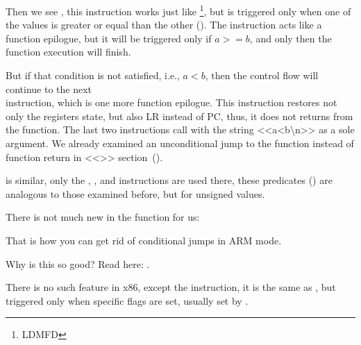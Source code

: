 
Then we see , this instruction works just like \footnote{\ac{LDMFD}},
but is triggered only when one of the values is greater or equal than the other ().
The  instruction acts like a function epilogue, but it will be triggered only if $a>=b$, and only then the function execution will finish.


But if that condition is not satisfied, i.e., $a<b$, then the control flow will continue to the next \\
 instruction, which is one more function epilogue. This instruction restores not only the  registers state, but also \ac{LR} instead of \ac{PC}, thus, it does not returns from the function.
The last two instructions call \printf with the string <<a<b\textbackslash{}n>> as a sole argument.
We already examined an unconditional jump to the \printf function instead of function return in <<\PrintfSeveralArgumentsSectionName>> section~().

 is similar, only the , , and  instructions are used there, these predicates () are analogous to those examined before, but for unsigned values.

There is not much new in the \main function for us:



That is how you can get rid of conditional jumps in ARM mode.

Why is this so good? Read here: .


There is no such feature in x86, except the  instruction, it is the same as \MOV,
but triggered only when specific flags are set, usually set by \CMP.

\mysubparagraph{\OptimizingKeilVI (\ThumbMode)}



